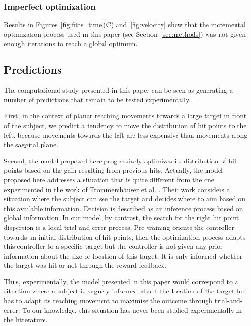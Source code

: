 \documentclass[10pt]{article}
\begin{document}
\subsubsection{Imperfect optimization}

Results in Figures~\ref{fig:fitts_time}(C) and~\ref{fig:velocity} show that the incremental optimization process used in this paper (see Section~\ref{sec:methods}) was not given enough iterations to reach a global optimum.


\subsection{Predictions}

The computational study presented in this paper can be seen as generating a number of predictions that remain to be tested experimentally.

First, in the context of planar reaching movements towards a large target in front of the subject, we predict a tendency to move the distribution of hit points to the left, because movements towards the left are less expensive than movements along the saggital plane.

Second, the model proposed here progressively optimizes its distribution of hit points based on the gain resulting from previous hits.
Actually, the model proposed here addresses a situation that is quite different from the one experimented in the work of Trommersh\"{a}user et al. \cite{Trommershauser2003a,Trommershauser2003b,Trommershauser2005}.
Their work considers a situation where the subject can see the target and decides where to aim based on this available information. Decision is described as an inference process based on global information. In our model, by contrast, the search for the right hit point dispersion is a local trial-and-error process. Pre-training orients the controller towards an initial distribution of hit points, then the optimization process adapts this controller to a specific target but the controller is not given any prior information about the size or location of this target. It is only informed whether the target was hit or not through the reward feedback.

Thus, experimentally, the model presented in this paper would correspond to a situation where a subject is vaguely informed about the location of the target but has to adapt its reaching movement to maximise the outcome through trial-and-error. To our knowledge, this situation has never been studied experimentally in the litterature.
\end{document}

